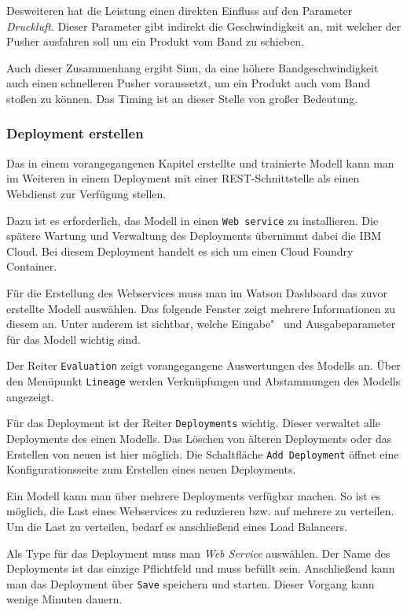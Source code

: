 Desweiteren hat die Leistung einen direkten Einfluss auf den Parameter \textit{Druckluft}. Dieser Parameter gibt
indirekt die Geschwindigkeit an, mit welcher der Pusher ausfahren soll um ein Produkt vom Band zu schieben.

Auch dieser Zusammenhang ergibt Sinn, da eine höhere Bandgeschwindigkeit auch einen schnelleren Pusher voraussetzt, um
ein Produkt auch vom Band stoßen zu können. Das Timing ist an dieser Stelle von großer Bedeutung.

\subsubsection{Deployment erstellen}
\label{subsec:deployment_erstellen}
Das in einem vorangegangenen Kapitel erstellte und trainierte Modell kann man im Weiteren in einem Deployment mit einer
REST-Schnittstelle als einen Webdienst zur Verfügung stellen.

Dazu ist es erforderlich, das Modell in einen \texttt{Web service} zu installieren. Die spätere Wartung und Verwaltung
des Deployments übernimmt dabei die IBM Cloud. Bei diesem Deployment handelt es sich um einen Cloud Foundry
Container.

Für die Erstellung des Webservices muss man im Watson Dashboard das zuvor erstellte Modell auswählen. Das folgende
Fenster zeigt mehrere Informationen zu diesem an. Unter anderem ist sichtbar, welche Eingabe"~ und Ausgabeparameter für
das Modell wichtig sind.

Der Reiter \texttt{Evaluation} zeigt vorangegangene Auswertungen des Modells an. Über den Menüpunkt \texttt{Lineage}
werden Verknüpfungen und Abstammungen des Modells angezeigt.

Für das Deployment ist der Reiter \texttt{Deployments} wichtig. Dieser verwaltet alle Deployments des einen Modells. Das
Löschen von älteren Deployments oder das Erstellen von neuen ist hier möglich. Die Schaltfläche \texttt{Add Deployment}
öffnet eine Konfigurationsseite zum Erstellen eines neuen Deployments.

Ein Modell kann man über mehrere Deployments verfügbar machen. So ist es möglich, die Last eines Webservices zu
reduzieren bzw. auf mehrere zu verteilen. Um die Last zu verteilen, bedarf es anschließend eines Load Balancers.

Als Type für das Deployment muss man \textit{Web Service} auswählen. Der Name des Deployments ist das einzige
Pflichtfeld und muss befüllt sein. Anschließend kann man das Deployment über \texttt{Save} speichern und starten. Dieser
Vorgang kann wenige Minuten dauern.


